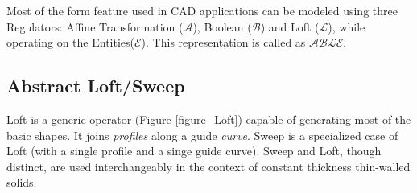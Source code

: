 Most of the form feature used in CAD applications can be modeled using  three Regulators: Affine Transformation ($\mathcal{A}$),  Boolean ($\mathcal{B}$) and Loft ($\mathcal{L}$), while  operating on the Entities($\mathcal{E}$).  This representation is called as {\bf $\mathcal{ABLE}$}. 

\subsection{Abstract Loft/Sweep}

Loft is a generic operator (Figure \ref{figure_Loft})  capable of generating most of the basic shapes. It joins {\em profiles} along a guide {\em curve}.  Sweep is a specialized case of Loft (with a single profile and a singe guide curve). Sweep and Loft, though distinct, are used interchangeably in the context of constant thickness thin-walled solids.

